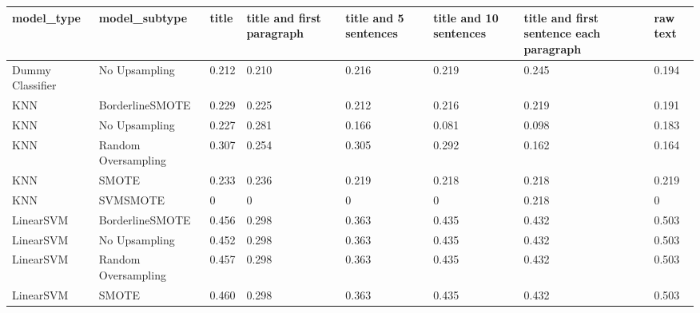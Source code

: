 \begin{tabular}{llllllll}
\toprule
                  model\_type &       model\_subtype & title & title and first paragraph & title and 5 sentences & title and 10 sentences & title and first sentence each paragraph & raw text \\
\midrule
            Dummy Classifier &       No Upsampling & 0.212 &                     0.210 &                 0.216 &                  0.219 &                                   0.245 &    0.194 \\
                         KNN &     BorderlineSMOTE & 0.229 &                     0.225 &                 0.212 &                  0.216 &                                   0.219 &    0.191 \\
                         KNN &       No Upsampling & 0.227 &                     0.281 &                 0.166 &                  0.081 &                                   0.098 &    0.183 \\
                         KNN & Random Oversampling & 0.307 &                     0.254 &                 0.305 &                  0.292 &                                   0.162 &    0.164 \\
                         KNN &               SMOTE & 0.233 &                     0.236 &                 0.219 &                  0.218 &                                   0.218 &    0.219 \\
                         KNN &            SVMSMOTE &     0 &                         0 &                     0 &                      0 &                                   0.218 &        0 \\
                   LinearSVM &     BorderlineSMOTE & 0.456 &                     0.298 &                 0.363 &                  0.435 &                                   0.432 &    0.503 \\
                   LinearSVM &       No Upsampling & 0.452 &                     0.298 &                 0.363 &                  0.435 &                                   0.432 &    0.503 \\
                   LinearSVM & Random Oversampling & 0.457 &                     0.298 &                 0.363 &                  0.435 &                                   0.432 &    0.503 \\
                   LinearSVM &               SMOTE & 0.460 &                     0.298 &                 0.363 &                  0.435 &                                   0.432 &    0.503 \\

\end{tabular}
